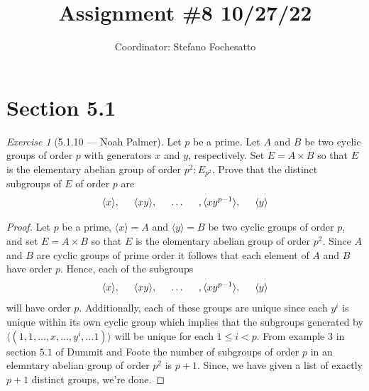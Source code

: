 \documentclass[12pt]{amsart}
\title{Assignment \#8 10/27/22}
\author{Coordinator: Stefano Fochesatto}
\theoremstyle{remark}
\newtheorem*{exercise}{Exercise}%
\theoremstyle{mycomment}
\begin{document}
\maketitle
\doublespacing %

\section*{Section 5.1}
\begin{exercise}[5.1.10 --- Noah Palmer] Let $p$ be a prime. Let $A$ and $B$ be two cyclic groups of order $p$ with generators $x$ and $y$, respectively. Set $E=A\times B$ so that $E$ is the elementary abelian group of order $p^2: E_{p^2}$. Prove that the distinct subgroups of $E$ of order $p$ are
$$\langle x\rangle,\hspace{0.5cm}\langle xy\rangle,\hspace{0.5cm}\ldots \hspace{0.5cm},\langle xy^{p-1}\rangle,\hspace{0.5cm}\langle y\rangle$$
\begin{proof}
Let $p$ be a prime, $\langle x\rangle=A$ and $\langle y\rangle=B$ be two cyclic groups of order $p$, and set $E=A\times B$ so that $E$ is the elementary abelian group of order $p^2$. Since $A$ and $B$ are cyclic groups of prime order it follows that each element of $A$ and $B$ have order $p$. Hence, each of the subgroups
$$\langle x\rangle,\hspace{0.5cm}\langle xy\rangle,\hspace{0.5cm}\ldots \hspace{0.5cm},\langle xy^{p-1}\rangle,\hspace{0.5cm}\langle y\rangle$$
will have order $p$. Additionally, each of these groups are unique since each $y^{i}$ is unique within its own cyclic group which implies that the subgroups generated by $\langle(1,1,\ldots,x,\ldots, y^i,\ldots 1)\rangle$ will be unique for each $1\leq i<p$. From example $3$ in section $5.1$ of Dummit and Foote the number of subgroups of order $p$ in an elemntary abelian group of order $p^2$ is $p+1$. Since, we have given a list of exactly $p+1$ distinct groups, we're done. 

\end{proof}
\end{exercise}
\end{document}
